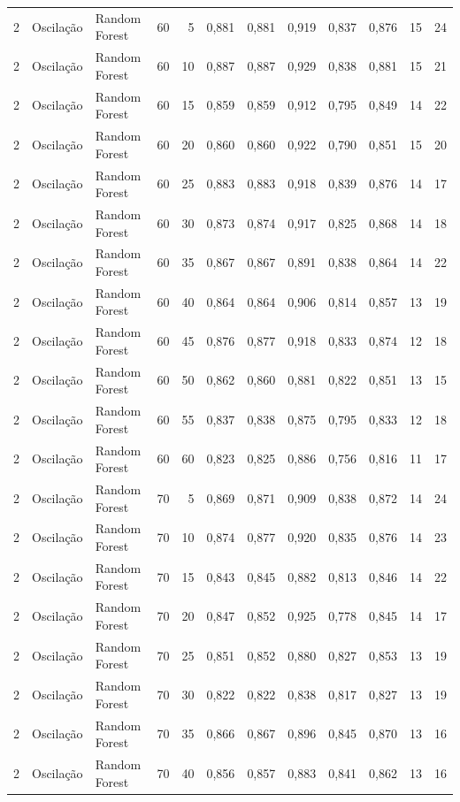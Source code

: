 \begin{longtable}{@{}rllrrrrrrrrr@{}}
2 & Oscilação & Random Forest & 60 & 5 & 0,881 & 0,881 & 0,919 & 0,837 & 0,876 & 15 & 24 \\
2 & Oscilação & Random Forest & 60 & 10 & 0,887 & 0,887 & 0,929 & 0,838 & 0,881 & 15 & 21 \\
2 & Oscilação & Random Forest & 60 & 15 & 0,859 & 0,859 & 0,912 & 0,795 & 0,849 & 14 & 22 \\
2 & Oscilação & Random Forest & 60 & 20 & 0,860 & 0,860 & 0,922 & 0,790 & 0,851 & 15 & 20 \\
2 & Oscilação & Random Forest & 60 & 25 & 0,883 & 0,883 & 0,918 & 0,839 & 0,876 & 14 & 17 \\
2 & Oscilação & Random Forest & 60 & 30 & 0,873 & 0,874 & 0,917 & 0,825 & 0,868 & 14 & 18 \\
2 & Oscilação & Random Forest & 60 & 35 & 0,867 & 0,867 & 0,891 & 0,838 & 0,864 & 14 & 22 \\
2 & Oscilação & Random Forest & 60 & 40 & 0,864 & 0,864 & 0,906 & 0,814 & 0,857 & 13 & 19 \\
2 & Oscilação & Random Forest & 60 & 45 & 0,876 & 0,877 & 0,918 & 0,833 & 0,874 & 12 & 18 \\
2 & Oscilação & Random Forest & 60 & 50 & 0,862 & 0,860 & 0,881 & 0,822 & 0,851 & 13 & 15 \\
2 & Oscilação & Random Forest & 60 & 55 & 0,837 & 0,838 & 0,875 & 0,795 & 0,833 & 12 & 18 \\
2 & Oscilação & Random Forest & 60 & 60 & 0,823 & 0,825 & 0,886 & 0,756 & 0,816 & 11 & 17 \\
2 & Oscilação & Random Forest & 70 & 5 & 0,869 & 0,871 & 0,909 & 0,838 & 0,872 & 14 & 24 \\
2 & Oscilação & Random Forest & 70 & 10 & 0,874 & 0,877 & 0,920 & 0,835 & 0,876 & 14 & 23 \\
2 & Oscilação & Random Forest & 70 & 15 & 0,843 & 0,845 & 0,882 & 0,813 & 0,846 & 14 & 22 \\
2 & Oscilação & Random Forest & 70 & 20 & 0,847 & 0,852 & 0,925 & 0,778 & 0,845 & 14 & 17 \\
2 & Oscilação & Random Forest & 70 & 25 & 0,851 & 0,852 & 0,880 & 0,827 & 0,853 & 13 & 19 \\
2 & Oscilação & Random Forest & 70 & 30 & 0,822 & 0,822 & 0,838 & 0,817 & 0,827 & 13 & 19 \\
2 & Oscilação & Random Forest & 70 & 35 & 0,866 & 0,867 & 0,896 & 0,845 & 0,870 & 13 & 16 \\
2 & Oscilação & Random Forest & 70 & 40 & 0,856 & 0,857 & 0,883 & 0,841 & 0,862 & 13 & 16 \\

\end{longtable}
